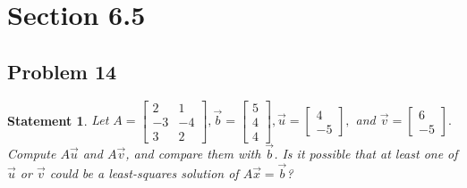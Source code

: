 \documentclass[12pt, letterpaper]{article}
\theoremstyle{statement}
\theoremstyle{statement}
\newtheorem*{atmStat}{Statement}
\begin{document}
    \section*{Section 6.5}
    \subsection*{Problem 14}
    \begin{atmStat}
    Let $A=\begin{bmatrix}
    2 & 1 \\
    -3 & -4 \\
    3 & 2
    \end{bmatrix}, \Vec{b} = \begin{bmatrix} 5\\4\\4\end{bmatrix}, \Vec{u}=\begin{bmatrix} 4\\-5\end{bmatrix},$ and $\Vec{v}=\begin{bmatrix}6\\-5\end{bmatrix}.$ Compute $A\Vec{u}$ and $A\Vec{v}$, and compare them with $\Vec{b}$. Is it possible that at least one of $\Vec{u}$ or $\Vec{v}$ could be a least-squares solution of $A\Vec{x}=\Vec{b}$?
    \end{atmStat}
\end{document}
